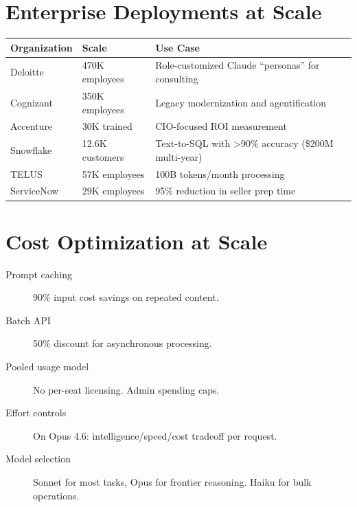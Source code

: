 \section{Enterprise Deployments at Scale}
\label{sec:enterprise-deployments}


\begin{fullwidth}
\begin{tabular}{@{}lp{3cm}p{6cm}@{}}
\toprule
\textbf{Organization} & \textbf{Scale} & \textbf{Use Case} \\
\midrule
Deloitte & 470K employees & Role-customized Claude ``personas'' for consulting \\
Cognizant & 350K employees & Legacy modernization and agentification \\
Accenture & 30K trained & CIO-focused ROI measurement \\
Snowflake & 12.6K customers & Text-to-SQL with >90\% accuracy (\$200M multi-year) \\
TELUS & 57K employees & 100B tokens/month processing \\
ServiceNow & 29K employees & 95\% reduction in seller prep time \\
\bottomrule
\end{tabular}
\end{fullwidth}

\section{Cost Optimization at Scale}
\label{sec:cost-scale}



\begin{description}
  \item[Prompt caching] 90\% input cost savings on repeated content.
  \item[Batch API] 50\% discount for asynchronous processing.
  \item[Pooled usage model] No per-seat licensing. Admin spending caps.
  \item[Effort controls] On Opus 4.6: intelligence/speed/cost tradeoff per request.
  \item[Model selection] Sonnet for most tasks, Opus for frontier reasoning.
    Haiku for bulk operations.
\end{description}

